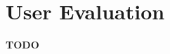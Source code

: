 \documentclass[a4paper,10pt]{report} %
\begin{document}



\chapter{User Evaluation}
\textbf{TODO}



%

\end{document}
